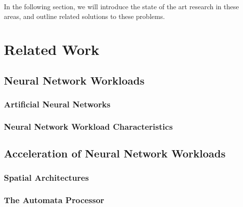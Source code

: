 In the following section, we will introduce the state of the art research in these areas, and outline related solutions to these problems.




\section{Related Work}

\subsection{Neural Network Workloads}
\subsubsection{Artificial Neural Networks}
\subsubsection{Neural Network Workload Characteristics}
\subsection{Acceleration of Neural Network Workloads}
\subsubsection{Spatial Architectures}
\subsubsection{The Automata Processor}
